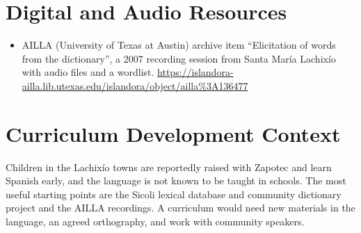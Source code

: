 \documentclass[12pt]{article}
\begin{document}
\section{Digital and Audio Resources}
\begin{itemize}
\item AILLA (University of Texas at Austin) archive item ``Elicitation of words from the dictionary'', a 2007 recording session from Santa Mar\'ia Lachix\'io with audio files and a wordlist. \url{https://islandora-ailla.lib.utexas.edu/islandora/object/ailla%3A136477}
\end{itemize}

\section{Curriculum Development Context}
Children in the Lachix\'io towns are reportedly raised with Zapotec and learn Spanish early, and the language is not known to be taught in schools. The most useful starting points are the Sicoli lexical database and community dictionary project and the AILLA recordings. A curriculum would need new materials in the language, an agreed orthography, and work with community speakers.
\end{document}
